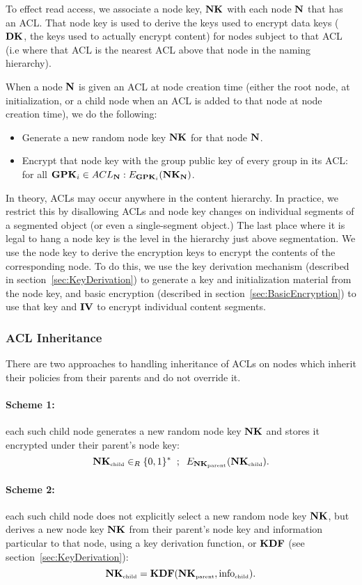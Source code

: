 To effect read access, we associate a node key, ${\textbf{NK}}$ with each node
${\textbf{N}}$ that has an ACL. That node key is used to derive the keys used to
encrypt data keys (${\textbf{DK}}$, the keys used to actually encrypt content)
for nodes subject to that ACL (i.e where that ACL is the nearest ACL
above that node in the naming hierarchy).

When a node ${\textbf{N}}$ is given an ACL at node creation time (either the
root node, at initialization, or a child node when an ACL is added to
that node at node creation time), we do the following:
\begin{itemize}
\item Generate a new random node key ${\textbf{NK}}$ for that node ${\textbf{N}}$.
\item Encrypt that node key with the group public key of every group in its ACL: for all ${\textbf{GPK}}_i \in ACL_{{\textbf{N}}} : E_{{\textbf{GPK}}_i}({\textbf{NK}}_{{\textbf{N}}})$.
\end{itemize}
In theory, ACLs may occur anywhere in the content hierarchy. In
practice, we restrict this by disallowing ACLs and node key changes on
individual segments of a segmented object (or even a single-segment
object.) The last place where it is legal to hang a node key is the
level in the hierarchy just above segmentation. We use the node key to
derive the encryption keys to encrypt the contents of the
corresponding node. To do this, we use the key derivation mechanism
(described in section~\ref{sec:KeyDerivation}) to generate a key and
initialization material from the node key, and basic encryption
(described in section~\ref{sec:BasicEncryption}) to use that key and
${\textbf{IV}}$ to encrypt individual content segments.

\subsubsection{ACL Inheritance}
\label{sec:ACLInheritance}

There are two approaches to handling inheritance of ACLs on nodes
which inherit their policies from their parents and do not override
it.

\paragraph{Scheme 1:} 
each such child node generates a new random node key ${\textbf{NK}}$ and stores it encrypted under their parent's node key:
$${\textbf{NK}}_{\mbox{\tiny child}} \in_{R} \{0,1\}^* \;\;;\;\; E_{{\textbf{NK}}_{\mbox{\tiny parent}}}({\textbf{NK}}_{\mbox{\tiny child}}).$$

\paragraph{Scheme 2:} 
each such child node does not explicitly select a new random node key
${\textbf{NK}}$, but derives a new node key ${\textbf{NK}}$ from their parent's node key
and information particular to that node, using a key derivation
function, or ${\textbf{KDF}}$ (see section~\ref{sec:KeyDerivation}):
$${\textbf{NK}}_{\mbox{\tiny child}} = {\textbf{KDF}}({\textbf{NK}}_{\mbox{\tiny parent}}, \mbox{info}_{\mbox{\tiny child}}).$$

